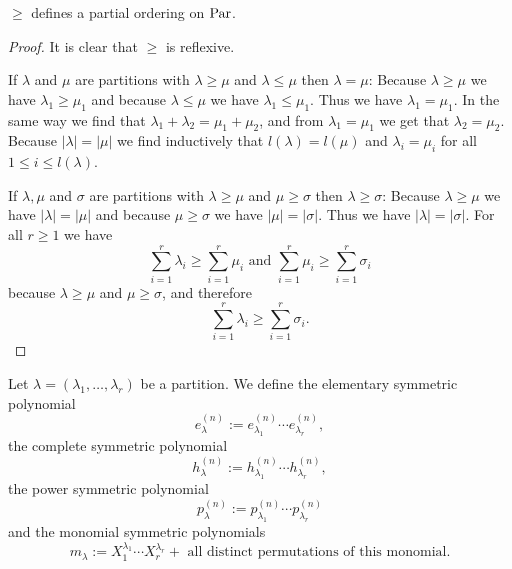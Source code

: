 \begin{lem}
 $\geq$ defines a partial ordering on $\operatorname{Par}$.
\end{lem}
\begin{proof}
 It is clear that $\geq$ is reflexive.
 
 If $\lambda$ and $\mu$ are partitions with $\lambda \geq \mu$ and $\lambda \leq \mu$ then $\lambda = \mu$: Because $\lambda \geq \mu$ we have $\lambda_1 \geq \mu_1$ and because $\lambda \leq \mu$ we have $\lambda_1 \leq \mu_1$. Thus we have $\lambda_1 = \mu_1$. In the same way we find that $\lambda_1 + \lambda_2 = \mu_1 + \mu_2$, and from $\lambda_1 = \mu_1$ we get that $\lambda_2 = \mu_2$. Because $|\lambda| = |\mu|$ we find inductively that $l(\lambda) = l(\mu)$ and $\lambda_i = \mu_i$ for all $1 \leq i \leq l(\lambda)$.
 
 If $\lambda, \mu$ and $\sigma$ are partitions with $\lambda \geq \mu$ and $\mu \geq \sigma$ then $\lambda \geq \sigma$: Because $\lambda \geq \mu$ we have $|\lambda| = |\mu|$ and because $\mu \geq \sigma$ we have $|\mu| = |\sigma|$. Thus we have $|\lambda| = |\sigma|$. For all $r \geq 1$ we have
 \[
  \sum_{i=1}^r \lambda_i \geq \sum_{i=1}^r \mu_i
  \text{ and }
  \sum_{i=1}^r \mu_i \geq \sum_{i=1}^r \sigma_i
 \]
 because $\lambda \geq \mu$ and $\mu \geq \sigma$, and therefore
 \[
  \sum_{i=1}^r \lambda_i \geq \sum_{i=1}^r \sigma_i.
 \]
\end{proof}


\begin{defi}
 Let $\lambda = (\lambda_1, \ldots, \lambda_r)$ be a partition. We define the elementary symmetric polynomial
 \[
  e^{(n)}_\lambda := e^{(n)}_{\lambda_1} \cdots e^{(n)}_{\lambda_r},
 \]
 the complete symmetric polynomial
 \[
  h^{(n)}_\lambda := h^{(n)}_{\lambda_1} \cdots h^{(n)}_{\lambda_r},
 \]
 the power symmetric polynomial
 \[
  p^{(n)}_\lambda := p^{(n)}_{\lambda_1} \cdots p^{(n)}_{\lambda_r}
 \]
 and the monomial symmetric polynomials
 \[
  m_\lambda := X_1^{\lambda_1} \cdots X_r^{\lambda_r} + \text{ all distinct permutations of this monomial}.
 \]
\end{defi}


